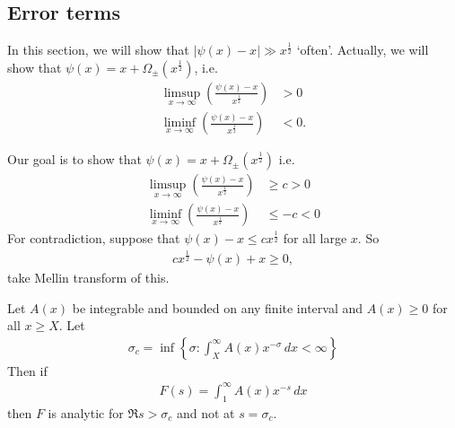 \documentclass{article}
\newcommand{\1}{\mathbbm{1}}
\begin{document}
\subsection{Error terms}
In this section, we will show that $|\psi(x) - x| \gg x^{\frac{1}{2}}$ `often'.
Actually, we will show that $\psi(x) = x+\Omega_{\pm}(x^{\frac{1}{2}})$, i.e.\
\begin{align*}
  \limsup_{x \to \infty} \left(\frac{\psi(x)-x}{x^{\frac 12}}\right) &> 0 \\
  \liminf_{x \to \infty} \left(\frac{\psi(x)-x}{x^{\frac 12}}\right) &< 0.
\end{align*}

\newlec
Our goal is to show that $\psi(x) = x + \Omega_\pm(x^{\frac{1}{2}})$
i.e.\
\begin{align*}
  \limsup_{x \to \infty} \left(\frac{\psi(x)-x}{x^{\frac 12}}\right) &\geq c > 0 \\
  \liminf_{x \to \infty} \left(\frac{\psi(x)-x}{x^{\frac 12}}\right) &\leq -c < 0
\end{align*}
For contradiction, suppose that $\psi(x) - x \leq c x^{\frac 12}$ for all large $x$.
So
\begin{align*}
  c x^{\frac 12} - \psi(x) + x \geq 0,
\end{align*}
take Mellin transform of this.
\begin{lemma}[Landau]
  Let $A(x)$ be integrable and bounded on any finite interval and $A(x) \geq 0$ for all $x \geq X$.
  Let
  \begin{align*}
    \sigma_c = \inf\left\{\sigma : \int_X^\infty A(x) x^{-\sigma}\,dx < \infty\right\}
  \end{align*}
  Then if
  \begin{align*}
    F(s) = \int_1^\infty A(x) x^{-s}\,dx
  \end{align*}
  then $F$ is analytic for $\Re s > \sigma_c$ and not at $s=\sigma_c$.
\end{lemma}
\end{document}
